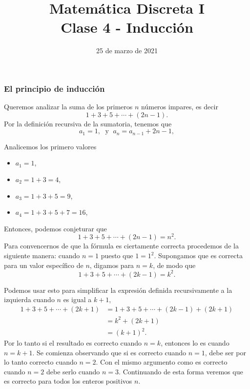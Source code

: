 \documentclass[handout]{beamer} %
\title[Clase 4 - Inducción]{Matemática Discreta I \\ Clase 4 - Inducción}
\institute[]{\normalsize FAMAF / UNC
	\\[\baselineskip] ${}^{}$
	\\[\baselineskip]
}
\date[25/03/2021]{25 de marzo   de 2021}
\begin{document}



\frame{\titlepage} 





\begin{frame}\frametitle{El principio de inducción} 

	Queremos  analizar la suma de los primeros $n$ números impares, es decir
	$$
	1+3+5+\cdots+(2n-1).
	$$
	\pause
	Por la definición recursiva de la sumatoria,  tenemos que 
	\begin{equation*}
	a_1 = 1, \;\text{  y } \; a_n = a_{n-1} + 2n-1,
	\end{equation*}\pause
	
	
	Analicemos los primero valores
	
	\begin{itemize}
		\item $a_1 = 1$,
		\item $a_2 = 1 + 3 = 4$, 
		\item $a_3 = 1 + 3 + 5 = 9$, 
		\item $a_4 = 1 + 3 + 5 + 7= 16 $, 
	\end{itemize}
	
\end{frame}


\begin{frame}	
	Entonces, podemos conjeturar que\pause
	$$
	1+3+5+\cdots+(2n-1) = n^2.
	$$
	\pause
	Para convencernos de que la fórmula es ciertamente correcta procedemos de la siguiente manera: cuando $n=1$ puesto que
	$1=1^2$.\pause
	Supongamos que es correcta para un valor específico
	de $n$, digamos para $n=k$, de modo que
	$$
	1+3+5+\cdots+(2k-1) = k^2.
	$$



\end{frame}

\begin{frame}
		Podemos usar esto para simplificar la expresión definida
	recursivamente a la izquierda cuando $n$ es igual a $k+1$,\pause
	$$
	\begin{aligned}
	1+3+5+\cdots+(2k+1) &= 1+3+5+\cdots+(2k-1) +(2k+1) \\
	&=k^2 +(2k+1) \\
	&=(k+1)^2.
	\end{aligned}
	$$\pause
	Por lo tanto si el resultado es correcto cuando $n=k$, entonces lo es cuando $n=k+1$. \pause Se comienza observando que si es correcto cuando $n=1$, debe ser por lo tanto correcto cuando $n=2$. Con el mismo argumento como es correcto cuando $n=2$ debe serlo cuando $n=3$. Continuando de esta forma veremos que es correcto para todos los enteros positivos $n$.
\end{frame}
\end{document}
